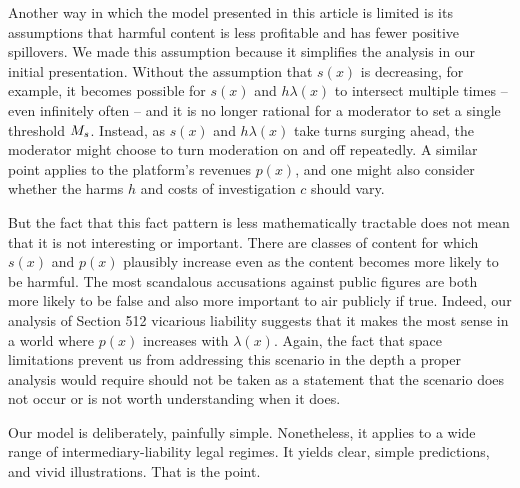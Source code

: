 Another way in which the model presented in this article is limited is its assumptions that harmful content is less profitable and has fewer positive spillovers. We made this assumption because it simplifies the analysis in our initial presentation. Without the assumption that $s(x)$ is decreasing, for example, it becomes possible for $s(x)$ and $h\lambda(x)$ to intersect multiple times -- even infinitely often -- and it is no longer rational for a moderator to set a single threshold $M_s$. Instead, as $s(x)$ and $h\lambda(x)$ take turns surging ahead, the moderator might choose to turn moderation on and off repeatedly. A similar point applies to the platform's revenues $p(x)$, and one might also consider whether the harms $h$ and costs of investigation $c$ should vary.

But the fact that this fact pattern is less mathematically tractable does not mean that it is not interesting or important. There are classes of content for which $s(x)$ and $p(x)$ plausibly increase even as the content becomes more likely to be harmful. The most scandalous accusations against public figures are both more likely to be false and also more important to air publicly if true. Indeed, our analysis of Section 512 vicarious liability suggests that it makes the most sense in a world where $p(x)$ increases with $\lambda(x)$. Again, the fact that space limitations prevent us from addressing this scenario in the depth a proper analysis would require should not be taken as a statement that the scenario does not occur or is not worth understanding when it does.

Our model is deliberately, painfully simple. Nonetheless, it applies to a wide range of intermediary-liability legal regimes. It yields clear, simple predictions, and vivid illustrations. That is the point.


